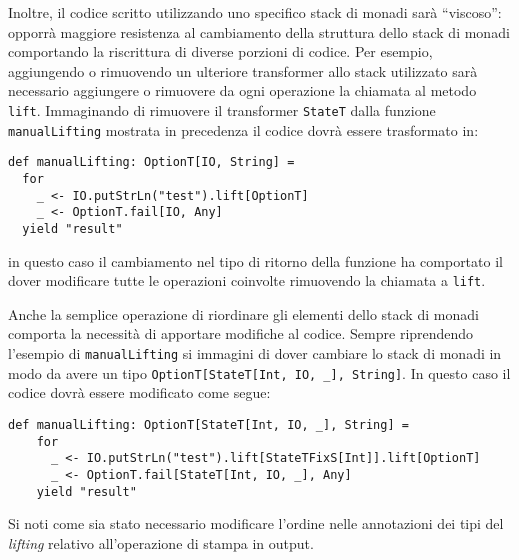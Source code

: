 Inoltre, il codice scritto utilizzando uno specifico stack di monadi sarà ``viscoso'': opporrà maggiore resistenza al cambiamento della struttura dello stack di monadi comportando la riscrittura di diverse porzioni di codice. Per esempio, aggiungendo o rimuovendo un ulteriore transformer allo stack utilizzato sarà necessario aggiungere o rimuovere da ogni operazione la chiamata al metodo \lstinline{lift}. Immaginando di rimuovere il transformer \lstinline{StateT} dalla funzione \lstinline{manualLifting} mostrata in precedenza il codice dovrà essere trasformato in:
\begin{lstlisting}[language=scala3]
def manualLifting: OptionT[IO, String] =
  for
    _ <- IO.putStrLn("test").lift[OptionT]
    _ <- OptionT.fail[IO, Any]
  yield "result"
\end{lstlisting}
in questo caso il cambiamento nel tipo di ritorno della funzione ha comportato il dover modificare tutte le operazioni coinvolte rimuovendo la chiamata a \lstinline{lift}.

Anche la semplice operazione di riordinare gli elementi dello stack di monadi comporta la necessità di apportare modifiche al codice. Sempre riprendendo l'esempio di \lstinline{manualLifting} si immagini di dover cambiare lo stack di monadi in modo da avere un tipo \lstinline{OptionT[StateT[Int, IO, _], String]}. In questo caso il codice dovrà essere modificato come segue:
\begin{lstlisting}[language=scala3]
  def manualLifting: OptionT[StateT[Int, IO, _], String] =
    for
      _ <- IO.putStrLn("test").lift[StateTFixS[Int]].lift[OptionT]
      _ <- OptionT.fail[StateT[Int, IO, _], Any]
    yield "result"
\end{lstlisting}
Si noti come sia stato necessario modificare l'ordine nelle annotazioni dei tipi del \emph{lifting} relativo all'operazione di stampa in output.

